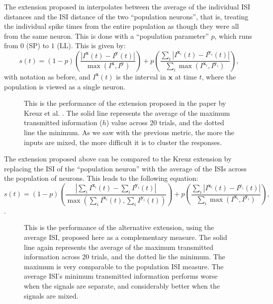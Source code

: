 \documentclass[12pt]{amsart}
\begin{document}
The extension proposed in \cite{Kreuzetal2009} interpolates between the average of the individual ISI distances and the ISI distance of the two ``population neurons'', that is, treating the individual spike times from the entire population as though they were all from the same neuron.  This is done with a ``population parameter'' $p$, which runs from $0$ (SP) to $1$ (LL).  This is given by:
\begin{equation}
\label{pop}
s(t) = (1-p)\left( \frac{ | I^{\mathbf{x}}(t) - I^{\mathbf{y}}(t) |}{ \max (I^{\mathbf{x}},I^{\mathbf{y}})}\right) + p\left( \frac{\sum_i | I^{\mathbf{x}_i}(t) - I^{\mathbf{y}_i}(t) |}{\sum_i \max (I^{\mathbf{x}_i},I^{\mathbf{y}_i})} \right),
\end{equation}
with notation as before, and $I^{\mathbf{x}}(t)$ is the interval in $\mathbf{x}$ at time $t$, where the population is viewed as a single neuron.

\begin{figure}[thb]
\begin{center}

\end{center}
\caption{\label{popmaxmin}This is the performance of the extension proposed in the paper by Kreuz et al. \cite{Kreuzetal2009}.  The solid line represents the average of the maximum transmitted information ($h$) value across 20 trials, and the dotted line the minimum.  As we saw with the previous metric, the more the inputs are mixed, the more difficult it is to cluster the responses.}
\end{figure}

The extension proposed above can be compared to the Kreuz extension by replacing the ISI of the ``population neuron'' with the average of the ISIs across the population of neurons.  This leads to the following equation: 
\begin{equation}
\label{av}
s(t) = (1-p) \left(\frac{ | \sum_i I^{\mathbf{x}_i}(t) - \sum_i I^{\mathbf{y}_i}(t) |}{\max (\sum_i I^{\mathbf{x}_i}(t),\sum_i I^{\mathbf{y}_i}(t) )}\right) + p\left( \frac{\sum_i | I^{\mathbf{x}_i}(t) - I^{\mathbf{y}_i}(t) |}{\sum_i \max (I^{\mathbf{x}_i},I^{\mathbf{y}_i})} \right),
\end{equation}.


\begin{figure}[htb]
\begin{center}

\end{center}
\caption{\label{avmaxmin} This is the performance of the alternative extension, using the average ISI, proposed here as a complementary measure. The solid line again represents the average of the maximum transmitted information across 20 trials, and the dotted lie the minimum.  The maximum is very comparable to the population ISI measure. The average ISI's minimum transmitted information performs worse when the signals are separate, and considerably better when the signals are mixed.}
\end{figure}
\end{document}
